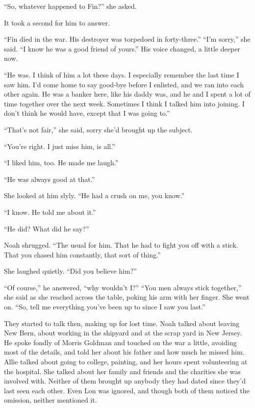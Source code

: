 \documentclass[10pt, twoside, openright]{book}
\begin{document}
``So, whatever happened to Fin?'' she asked.

It took a second for him to answer.

``Fin died in the war. His destroyer was torpedoed in forty-three.''
``I'm sorry,'' she said. ``I know he was a good friend of yours.'' His
voice changed, a little deeper now.


``He was. I think of him a lot these days. I especially remember the
last time I saw him. I'd come home to say good-bye before I enlisted,
and we ran into each other again. He was a banker here, like his daddy
was, and he and I spent a lot of time together over the next week.
Sometimes I think I talked him into joining. I don't think he would
have, except that I was going to.''


``That's not fair,'' she said, sorry she'd brought up the subject.

``You're right. I just miss him, is all.''

``I liked him, too. He made me laugh.''

``He was always good at that.''

She looked at him slyly. ``He had a crush on me, you know.''

``I know. He told me about it.''

``He did? What did he say?''


Noah shrugged. ``The usual for him. That he had to fight you off with a
stick. That you chased him constantly, that sort of thing.''


She laughed quietly. ``Did you believe him?''


``Of course,'' he answered, ``why wouldn't I?'' ``You men always stick
together,'' she said as she reached across the table, poking his arm
with her finger. She went on. ``So, tell me everything you've been up to
since I saw you last.''

They started to talk then, making up for lost time. Noah talked about
leaving New Bern, about working in the shipyard and at the scrap yard in
New Jersey. He spoke fondly of Morris Goldman and touched on the war a
little, avoiding most of the details, and told her about his father and
how much he missed him. Allie talked about going to college, painting,
and her hours spent volunteering at the hospital. She talked about her
family and friends and the charities she was involved with. Neither of
them brought up anybody they had dated since they'd last seen each
other. Even Lon was ignored, and though both of them noticed the
omission, neither mentioned it.
\end{document}
